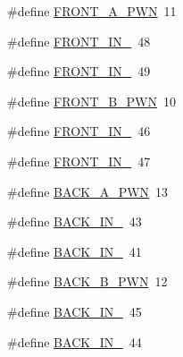 \begin{DoxyCompactItemize}
\#define \hyperlink{car_8ino_ab326384eb90dc7dd1958ce8b09952513}{F\+R\+O\+N\+T\+\_\+\+A\+\_\+\+P\+WN}~11
\item 
\#define \hyperlink{car_8ino_abedc250958d71e2eb009a81184c703de}{F\+R\+O\+N\+T\+\_\+\+I\+N\+\_}~48
\item 
\#define \hyperlink{car_8ino_a9468ef02de181ac8503508ff005cfa40}{F\+R\+O\+N\+T\+\_\+\+I\+N\+\_}~49
\item 
\#define \hyperlink{car_8ino_aae839574086fcabaf850f470644bc7a8}{F\+R\+O\+N\+T\+\_\+\+B\+\_\+\+P\+WN}~10
\item 
\#define \hyperlink{car_8ino_a4754d2774432266bf9f066638c6e06d7}{F\+R\+O\+N\+T\+\_\+\+I\+N\+\_}~46
\item 
\#define \hyperlink{car_8ino_a9c739ab0e8d980f8855e69230bc919ca}{F\+R\+O\+N\+T\+\_\+\+I\+N\+\_}~47
\item 
\#define \hyperlink{car_8ino_afdb8a33d60147799dac8fbb339510734}{B\+A\+C\+K\+\_\+\+A\+\_\+\+P\+WN}~13
\item 
\#define \hyperlink{car_8ino_a36df21899746bfb8fe0f710bb6bf6276}{B\+A\+C\+K\+\_\+\+I\+N\+\_}~43
\item 
\#define \hyperlink{car_8ino_a7a3ad88d54749e56e743a85f810b3e12}{B\+A\+C\+K\+\_\+\+I\+N\+\_}~41
\item 
\#define \hyperlink{car_8ino_a367d04e137f931b359091a61cdbb3c29}{B\+A\+C\+K\+\_\+\+B\+\_\+\+P\+WN}~12
\item 
\#define \hyperlink{car_8ino_a180305dc44cf0ddb3b20f5ec4c6c281d}{B\+A\+C\+K\+\_\+\+I\+N\+\_}~45
\item 
\#define \hyperlink{car_8ino_a7f821dd617bfed158351387c803a2b55}{B\+A\+C\+K\+\_\+\+I\+N\+\_}~44
\end{DoxyCompactItemize}
